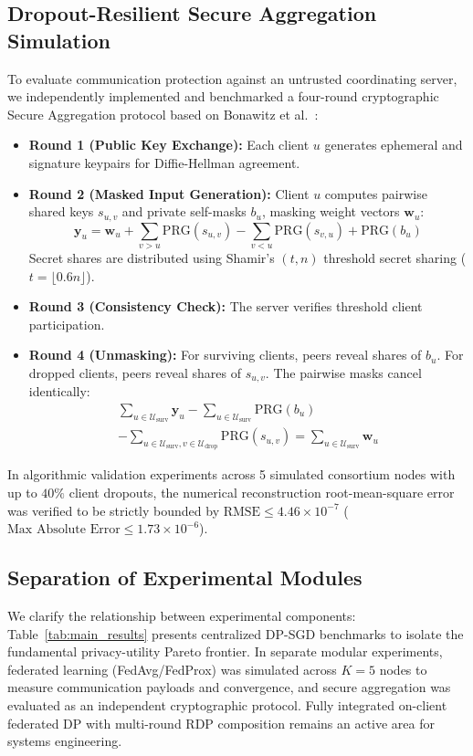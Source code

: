\documentclass[conference]{IEEEtran}
\begin{document}
\subsection{Dropout-Resilient Secure Aggregation Simulation}
To evaluate communication protection against an untrusted coordinating server, we independently implemented and benchmarked a four-round cryptographic Secure Aggregation protocol based on Bonawitz et al.~\cite{bonawitz2017practical}:
\begin{itemize}
    \item \textbf{Round 1 (Public Key Exchange):} Each client $u$ generates ephemeral and signature keypairs for Diffie-Hellman agreement.
    \item \textbf{Round 2 (Masked Input Generation):} Client $u$ computes pairwise shared keys $s_{u,v}$ and private self-masks $b_u$, masking weight vectors $\mathbf{w}_u$:
    \begin{equation}
        \mathbf{y}_u = \mathbf{w}_u + \sum_{v > u} \text{PRG}(s_{u,v}) - \sum_{v < u} \text{PRG}(s_{v,u}) + \text{PRG}(b_u)
    \end{equation}
    Secret shares are distributed using Shamir's $(t, n)$ threshold secret sharing ($t = \lfloor 0.6n \rfloor$).
    \item \textbf{Round 3 (Consistency Check):} The server verifies threshold client participation.
    \item \textbf{Round 4 (Unmasking):} For surviving clients, peers reveal shares of $b_u$. For dropped clients, peers reveal shares of $s_{u,v}$. The pairwise masks cancel identically:
    \begin{multline}
        \sum_{u \in \mathcal{U}_{\text{surv}}} \mathbf{y}_u - \sum_{u \in \mathcal{U}_{\text{surv}}} \text{PRG}(b_u) \\
        - \sum_{u \in \mathcal{U}_{\text{surv}}, v \in \mathcal{U}_{\text{drop}}} \text{PRG}(s_{u,v}) = \sum_{u \in \mathcal{U}_{\text{surv}}} \mathbf{w}_u
    \end{multline}
\end{itemize}
In algorithmic validation experiments across 5 simulated consortium nodes with up to $40\%$ client dropouts, the numerical reconstruction root-mean-square error was verified to be strictly bounded by $\text{RMSE} \le 4.46 \times 10^{-7}$ ($\text{Max Absolute Error} \le 1.73 \times 10^{-6}$).

\subsection{Separation of Experimental Modules}
We clarify the relationship between experimental components: Table~\ref{tab:main_results} presents centralized DP-SGD benchmarks to isolate the fundamental privacy-utility Pareto frontier. In separate modular experiments, federated learning (\textsf{FedAvg}/\textsf{FedProx}) was simulated across $K=5$ nodes to measure communication payloads and convergence, and secure aggregation was evaluated as an independent cryptographic protocol. Fully integrated on-client federated DP with multi-round RDP composition remains an active area for systems engineering.
\end{document}
